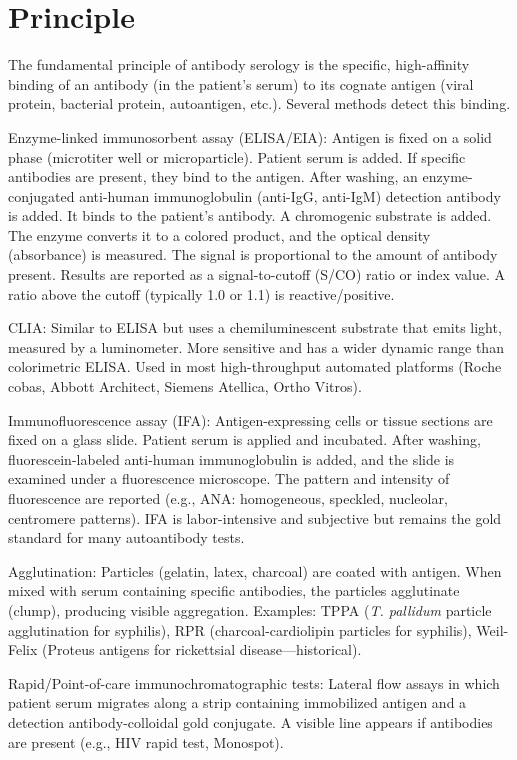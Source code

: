 \section*{Principle}
The fundamental principle of antibody serology is the specific, high-affinity binding of an antibody (in the patient's serum) to its cognate antigen (viral protein, bacterial protein, autoantigen, etc.). Several methods detect this binding.

Enzyme-linked immunosorbent assay (ELISA/EIA): Antigen is fixed on a solid phase (microtiter well or microparticle). Patient serum is added. If specific antibodies are present, they bind to the antigen. After washing, an enzyme-conjugated anti-human immunoglobulin (anti-IgG, anti-IgM) detection antibody is added. It binds to the patient's antibody. A chromogenic substrate is added. The enzyme converts it to a colored product, and the optical density (absorbance) is measured. The signal is proportional to the amount of antibody present. Results are reported as a signal-to-cutoff (S/CO) ratio or index value. A ratio above the cutoff (typically 1.0 or 1.1) is reactive/positive.

CLIA: Similar to ELISA but uses a chemiluminescent substrate that emits light, measured by a luminometer. More sensitive and has a wider dynamic range than colorimetric ELISA. Used in most high-throughput automated platforms (Roche cobas, Abbott Architect, Siemens Atellica, Ortho Vitros).

Immunofluorescence assay (IFA): Antigen-expressing cells or tissue sections are fixed on a glass slide. Patient serum is applied and incubated. After washing, fluorescein-labeled anti-human immunoglobulin is added, and the slide is examined under a fluorescence microscope. The pattern and intensity of fluorescence are reported (e.g., ANA: homogeneous, speckled, nucleolar, centromere patterns). IFA is labor-intensive and subjective but remains the gold standard for many autoantibody tests.

Agglutination: Particles (gelatin, latex, charcoal) are coated with antigen. When mixed with serum containing specific antibodies, the particles agglutinate (clump), producing visible aggregation. Examples: TPPA (\textit{T. pallidum} particle agglutination for syphilis), RPR (charcoal-cardiolipin particles for syphilis), Weil-Felix (Proteus antigens for rickettsial disease---historical).

Rapid/Point-of-care immunochromatographic tests: Lateral flow assays in which patient serum migrates along a strip containing immobilized antigen and a detection antibody-colloidal gold conjugate. A visible line appears if antibodies are present (e.g., HIV rapid test, Monospot).


